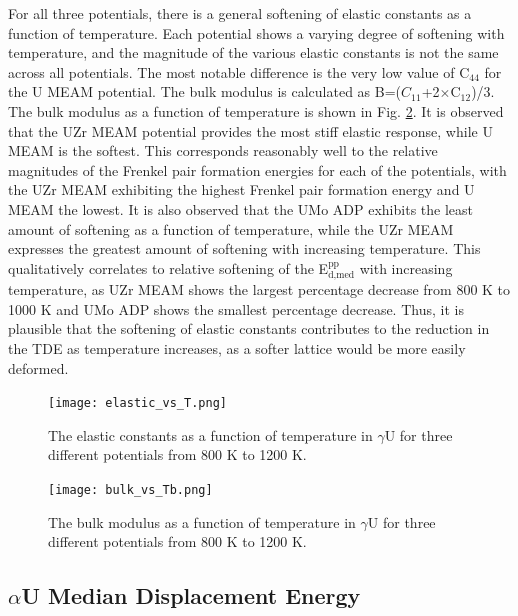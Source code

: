 \documentclass[review]{elsarticle}
\begin{document}
For all three potentials, there is a general softening of elastic constants as a function of temperature. Each potential shows a varying degree of softening with temperature, and the magnitude of the various elastic constants is not the same across all potentials. The most notable difference is the very low value of C$_{44}$ for the U MEAM potential. The bulk modulus is calculated as B=($C_{11}$+2$\times$C$_{12}$)/3. The bulk modulus as a function of temperature is shown in Fig. \ref{fig:bulk}. It is observed that the UZr MEAM potential provides the most stiff elastic response, while U MEAM is the softest. This corresponds reasonably well to the relative magnitudes of the Frenkel pair formation energies for each of the potentials, with the UZr MEAM exhibiting the highest Frenkel pair formation energy and U MEAM the lowest. It is also observed that the UMo ADP exhibits the least amount of softening as a function of temperature, while the UZr MEAM expresses the greatest amount of softening with increasing temperature. This qualitatively correlates to relative softening of the E$^{\textrm{pp}}_{\textrm{d,med}}$ with increasing temperature, as UZr MEAM shows the largest percentage decrease from 800 K to 1000 K and UMo ADP shows the smallest percentage decrease. Thus, it is plausible that the softening of elastic constants contributes to the reduction in the TDE as temperature increases, as a softer lattice would be more easily deformed. 


\begin{figure}[h]
 \centering
 \texttt{[image: elastic\_vs\_T.png]} 
 \caption{The elastic constants as a function of temperature in $\gamma$U for three different potentials from 800 K to 1200 K.}
 \label{fig:elastic}
\end{figure}

\begin{figure}[h]
 \centering
 \texttt{[image: bulk\_vs\_Tb.png]} 
 \caption{The bulk modulus as a function of temperature in $\gamma$U for three different potentials from 800 K to 1200 K.}
 \label{fig:bulk}
\end{figure}

\FloatBarrier

\subsection{$\alpha$U Median Displacement Energy}
\end{document}
